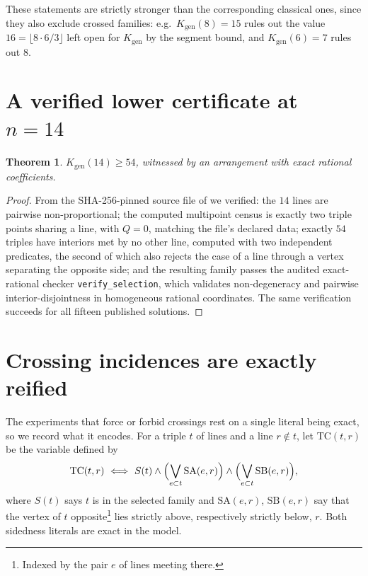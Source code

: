 \documentclass[11pt]{article}
\newtheorem{theorem}{Theorem}
\theoremstyle{definition}
\newcommand{\Kgen}{K_{\mathrm{gen}}}
\begin{document}
These statements are strictly stronger than the corresponding classical ones,
since they also exclude crossed families: e.g.\ $\Kgen(8)=15$ rules out the
value $16=\lfloor 8\cdot 6/3\rfloor$ left open for $\Kgen$ by the segment
bound, and $\Kgen(6)=7$ rules out $8$.

\section{A verified lower certificate at $n=14$}

\begin{theorem}\label{thm:54}
$\Kgen(14)\ge54$, witnessed by an arrangement with exact rational
coefficients.
\end{theorem}

\begin{proof}
From the SHA-256-pinned source file of \cite{Maiorana} we verified: the $14$
lines are pairwise non-proportional; the computed multipoint census is exactly
two triple points sharing a line, with $Q=0$, matching the file's declared
data; exactly $54$ triples have interiors met by no other line, computed with
two independent predicates, the second of which also rejects the case of a
line through a vertex separating the opposite side; and the resulting family
passes the audited exact-rational checker \texttt{verify\_selection}, which
validates non-degeneracy and pairwise interior-disjointness in homogeneous
rational coordinates. The same verification succeeds for all fifteen
published solutions.
\end{proof}

\section{Crossing incidences are exactly reified}\label{sec:tc}

The experiments that force or forbid crossings rest on a single literal being
exact, so we record what it encodes. For a triple $t$ of lines and a line
$r\notin t$, let $\mathrm{TC}(t,r)$ be the variable defined by
\begin{equation}\label{eq:tc}
 \mathrm{TC}(t,r)\ \Longleftrightarrow\ S(t)\wedge
 \Bigl(\bigvee_{e\subset t}\mathrm{SA}(e,r)\Bigr)\wedge
 \Bigl(\bigvee_{e\subset t}\mathrm{SB}(e,r)\Bigr),
\end{equation}
where $S(t)$ says $t$ is in the selected family and $\mathrm{SA}(e,r)$,
$\mathrm{SB}(e,r)$ say that the vertex of $t$ opposite\footnote{Indexed by
the pair $e$ of lines meeting there.} lies strictly above, respectively
strictly below, $r$. Both sidedness literals are exact in the model.
\end{document}
